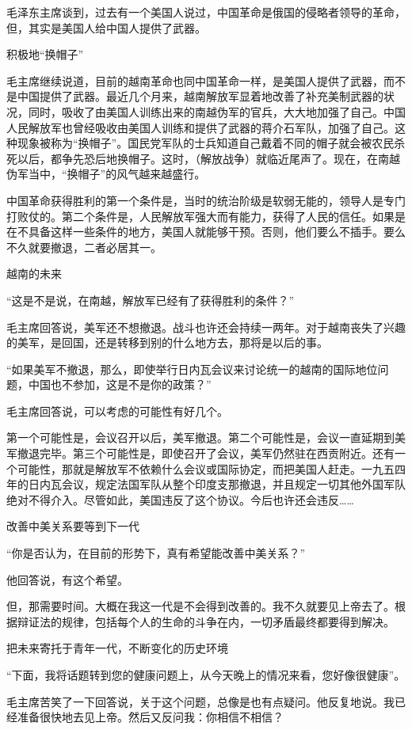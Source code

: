 毛泽东主席谈到，过去有一个美国人说过，中国革命是俄国的侵略者领导的革命，但，其实是美国人给中国人提供了武器。

积极地“换帽子”

毛主席继续说道，目前的越南革命也同中国革命一样，是美国人提供了武器，而不是中国提供了武器。最近几个月来，越南解放军显着地改善了补充美制武器的状况，同时，吸收了由美国人训练出来的南越伪军的官兵，大大地加强了自己。中国人民解放军也曾经吸收由美国人训练和提供了武器的蒋介石军队，加强了自己。这种现象被称为“换帽子”。国民党军队的士兵知道自己戴着不同的帽子就会被农民杀死以后，都争先恐后地换帽子。这时，（解放战争）就临近尾声了。现在，在南越伪军当中，“换帽子”的风气越来越盛行。

中国革命获得胜利的第一个条件是，当时的统治阶级是软弱无能的，领导人是专门打败仗的。第二个条件是，人民解放军强大而有能力，获得了人民的信任。如果是在不具备这样一些条件的地方，美国人就能够干预。否则，他们要么不插手。要么不久就要撤退，二者必居其一。

越南的未来

“这是不是说，在南越，解放军已经有了获得胜利的条件？”

毛主席回答说，美军还不想撤退。战斗也许还会持续一两年。对于越南丧失了兴趣的美军，是回国，还是转移到别的什么地方去，那将是以后的事。

“如果美军不撤退，那么，即使举行日内瓦会议来讨论统一的越南的国际地位问题，中国也不参加，这是不是你的政策？”

毛主席回答说，可以考虑的可能性有好几个。

第一个可能性是，会议召开以后，美军撤退。第二个可能性是，会议一直延期到美军撤退完毕。第三个可能性是，即使召开了会议，美军仍然驻在西贡附近。还有一个可能性，那就是解放军不依赖什么会议或国际协定，而把美国人赶走。一九五四年的日内瓦会议，规定法国军队从整个印度支那撤退，并且规定一切其他外国军队绝对不得介入。尽管如此，美国违反了这个协议。今后也许还会违反……

改善中美关系要等到下一代

“你是否认为，在目前的形势下，真有希望能改善中美关系？”

他回答说，有这个希望。

但，那需要时间。大概在我这一代是不会得到改善的。我不久就要见上帝去了。根据辩证法的规律，包括每个人的生命的斗争在内，一切矛盾最终都要得到解决。

把未来寄托于青年一代，不断变化的历史环境

“下面，我将话题转到您的健康问题上，从今天晚上的情况来看，您好像很健康”。

毛主席苦笑了一下回答说，关于这个问题，总像是也有点疑问。他反复地说。我已经准备很快地去见上帝。然后又反问我：你相信不相信？

